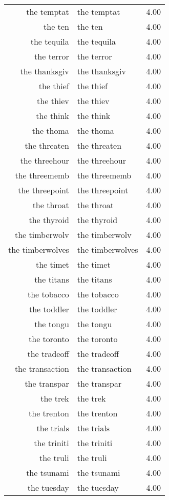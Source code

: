 \begin{table}[ht]
\begin{tabular}{rlr}
  the temptat & the temptat & 4.00 \\ 
  the ten & the ten & 4.00 \\ 
  the tequila & the tequila & 4.00 \\ 
  the terror & the terror & 4.00 \\ 
  the thanksgiv & the thanksgiv & 4.00 \\ 
  the thief & the thief & 4.00 \\ 
  the thiev & the thiev & 4.00 \\ 
  the think & the think & 4.00 \\ 
  the thoma & the thoma & 4.00 \\ 
  the threaten & the threaten & 4.00 \\ 
  the threehour & the threehour & 4.00 \\ 
  the threememb & the threememb & 4.00 \\ 
  the threepoint & the threepoint & 4.00 \\ 
  the throat & the throat & 4.00 \\ 
  the thyroid & the thyroid & 4.00 \\ 
  the timberwolv & the timberwolv & 4.00 \\ 
  the timberwolves & the timberwolves & 4.00 \\ 
  the timet & the timet & 4.00 \\ 
  the titans & the titans & 4.00 \\ 
  the tobacco & the tobacco & 4.00 \\ 
  the toddler & the toddler & 4.00 \\ 
  the tongu & the tongu & 4.00 \\ 
  the toronto & the toronto & 4.00 \\ 
  the tradeoff & the tradeoff & 4.00 \\ 
  the transaction & the transaction & 4.00 \\ 
  the transpar & the transpar & 4.00 \\ 
  the trek & the trek & 4.00 \\ 
  the trenton & the trenton & 4.00 \\ 
  the trials & the trials & 4.00 \\ 
  the triniti & the triniti & 4.00 \\ 
  the truli & the truli & 4.00 \\ 
  the tsunami & the tsunami & 4.00 \\ 
  the tuesday & the tuesday & 4.00 \\ 

\end{tabular}
\end{table}

